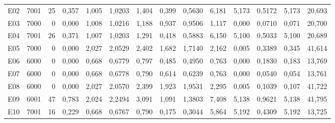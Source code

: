 \begin{singlespace}
\begin{longtable}{@{}lrrrrrrrrrrrrr@{}}
E02 & 7001 & 25 & 0{,}357 & 1{,}005 & 1{,}0203 & 1{,}404 & 0{,}399 & 0{,}5630 & 6{,}181 & 5{,}173 & 0{,}5172 & 5{,}173 & 20{,}693\\
E03 & 7000 & 0 & 0{,}000 & 1{,}008 & 1{,}0216 & 1{,}188 & 0{,}937 & 0{,}9506 & 1{,}117 & 0{,}000 & 0{,}0710 & 0{,}071 & 20{,}700\\
E04 & 7001 & 26 & 0{,}371 & 1{,}007 & 1{,}0203 & 1{,}291 & 0{,}418 & 0{,}5883 & 6{,}150 & 5{,}100 & 0{,}5033 & 5{,}100 & 20{,}689\\
E05 & 7000 & 0 & 0{,}000 & 2{,}027 & 2{,}0529 & 2{,}402 & 1{,}682 & 1{,}7140 & 2{,}162 & 0{,}005 & 0{,}3389 & 0{,}345 & 41{,}614\\
E06 & 6000 & 0 & 0{,}000 & 0{,}668 & 0{,}6779 & 0{,}797 & 0{,}485 & 0{,}4950 & 0{,}763 & 0{,}000 & 0{,}1830 & 0{,}183 & 13{,}769\\
E07 & 6000 & 0 & 0{,}000 & 0{,}668 & 0{,}6778 & 0{,}790 & 0{,}614 & 0{,}6239 & 0{,}763 & 0{,}000 & 0{,}0540 & 0{,}054 & 13{,}761\\
E08 & 6000 & 0 & 0{,}000 & 2{,}027 & 2{,}0570 & 2{,}399 & 1{,}923 & 1{,}9531 & 2{,}295 & 0{,}005 & 0{,}1039 & 0{,}107 & 41{,}722\\
E09 & 6001 & 47 & 0{,}783 & 2{,}024 & 2{,}2494 & 3{,}091 & 1{,}091 & 1{,}3803 & 7{,}408 & 5{,}138 & 0{,}9621 & 5{,}138 & 41{,}795\\
E10 & 7001 & 16 & 0{,}229 & 0{,}668 & 0{,}6767 & 0{,}790 & 0{,}175 & 0{,}3044 & 5{,}864 & 5{,}192 & 0{,}4309 & 5{,}192 & 13{,}725\\
\end{longtable}
\endgroup
{}
\end{singlespace}
